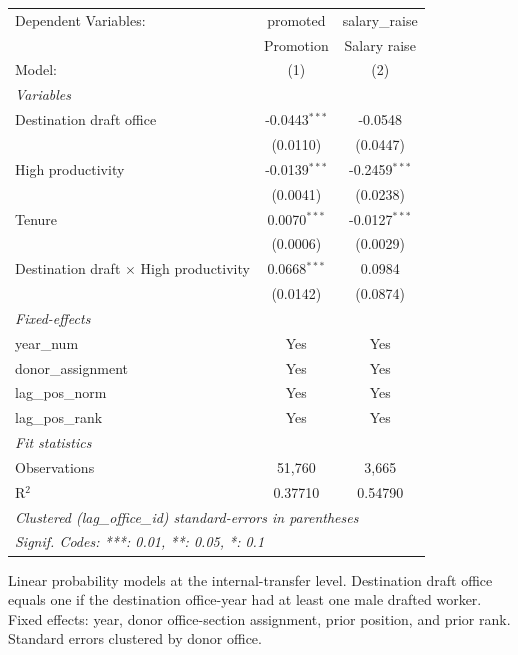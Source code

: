 
\begingroup
\centering
\begin{tabular}{lcc}
   \tabularnewline \midrule \midrule
   Dependent Variables:                          & promoted        & salary\_raise\\   
                                                 & Promotion       & Salary raise \\   
   Model:                                        & (1)             & (2)\\  
   \midrule
   \emph{Variables}\\
   Destination draft office                      & -0.0443$^{***}$ & -0.0548\\   
                                                 & (0.0110)        & (0.0447)\\   
   High productivity                             & -0.0139$^{***}$ & -0.2459$^{***}$\\   
                                                 & (0.0041)        & (0.0238)\\   
   Tenure                                        & 0.0070$^{***}$  & -0.0127$^{***}$\\   
                                                 & (0.0006)        & (0.0029)\\   
   Destination draft $\times$ High productivity  & 0.0668$^{***}$  & 0.0984\\   
                                                 & (0.0142)        & (0.0874)\\   
   \midrule
   \emph{Fixed-effects}\\
   year\_num                                     & Yes             & Yes\\  
   donor\_assignment                             & Yes             & Yes\\  
   lag\_pos\_norm                                & Yes             & Yes\\  
   lag\_pos\_rank                                & Yes             & Yes\\  
   \midrule
   \emph{Fit statistics}\\
   Observations                                  & 51,760          & 3,665\\  
   R$^2$                                         & 0.37710         & 0.54790\\  
   \midrule \midrule
   \multicolumn{3}{l}{\emph{Clustered (lag\_office\_id) standard-errors in parentheses}}\\
   \multicolumn{3}{l}{\emph{Signif. Codes: ***: 0.01, **: 0.05, *: 0.1}}\\
\end{tabular}
 
\par \raggedright 
Linear probability models at the internal-transfer level. Destination draft office equals one if the destination office-year had at least one male drafted worker. Fixed effects: year, donor office-section assignment, prior position, and prior rank. Standard errors clustered by donor office.
\par\endgroup


